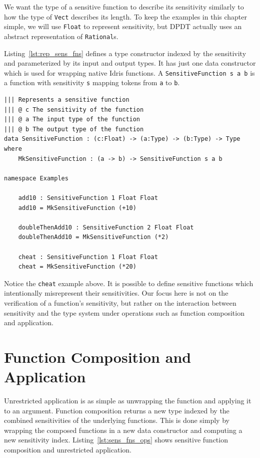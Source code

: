 \documentclass[12pt]{report}
\begin{document}
We want the type of a sensitive function to describe its sensitivity similarly to how the type of \texttt{Vect} describes its length.
To keep the examples in this chapter simple, we will use \texttt{Float} to represent sensitivity, but DPDT actually uses an abstract representation of \texttt{Rational}s.

Listing~\ref{lst:rep_sens_fns} defines a type constructor indexed by the sensitivity and parameterized by its input and output types.
It has just one data constructor which is used for wrapping native Idris functions.
A \texttt{SensitiveFunction s a b} is a function with sensitivity \texttt{s} mapping tokens from \texttt{a} to \texttt{b}.

\begin{lstlisting}[caption={Representing sensitive functions},label={lst:rep_sens_fns}]
||| Represents a sensitive function
||| @ c The sensitivity of the function
||| @ a The input type of the function
||| @ b The output type of the function
data SensitiveFunction : (c:Float) -> (a:Type) -> (b:Type) -> Type where
    MkSensitiveFunction : (a -> b) -> SensitiveFunction s a b

namespace Examples

    add10 : SensitiveFunction 1 Float Float
    add10 = MkSensitiveFunction (+10)

    doubleThenAdd10 : SensitiveFunction 2 Float Float
    doubleThenAdd10 = MkSensitiveFunction (*2)

    cheat : SensitiveFunction 1 Float Float
    cheat = MkSensitiveFunction (*20)
\end{lstlisting}

Notice the \texttt{cheat} example above.
It is possible to define sensitive functions which intentionally misrepresent their sensitivities.
Our focus here is not on the verification of a function's sensitivity, but rather on the interaction between sensitivity and the type system under operations such as function composition and application.

\section{Function Composition and Application}

Unrestricted application is as simple as unwrapping the function and applying it to an argument.
Function composition returns a new type indexed by the combined sensitivities of the underlying functions.
This is done simply by wrapping the composed functions in a new data constructor and computing a new sensitivity index.
Listing~\ref{lst:sens_fns_ops} shows sensitive function composition and unrestricted application.
\end{document}
